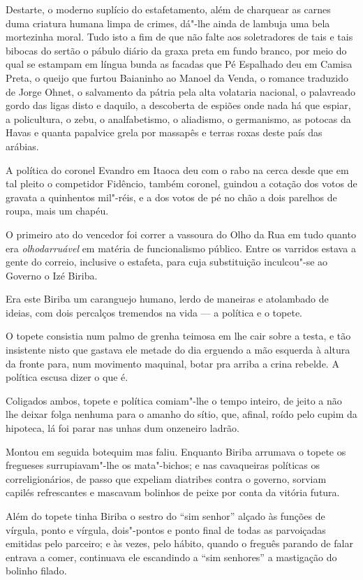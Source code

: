 Destarte, o moderno suplício do estafetamento, além de charquear as
carnes duma criatura humana limpa de crimes, dá"-lhe ainda de lambuja uma
bela mortezinha moral. Tudo isto a fim de que não falte aos soletradores
de tais e tais bibocas do sertão o pábulo diário da graxa preta em fundo
branco, por meio do qual se estampam em língua bunda as facadas que Pé
Espalhado deu em Camisa Preta, o queijo que furtou Baianinho ao Manoel
da Venda, o romance traduzido de Jorge Ohnet, o salvamento da pátria
pela alta volataria nacional, o palavreado gordo das ligas disto e
daquilo, a descoberta de espiões onde nada há que espiar, a policultura,
o zebu, o analfabetismo, o aliadismo, o germanismo, as potocas da Havas
e quanta papalvice grela por massapês e terras roxas deste país das
arábias.

A política do coronel Evandro em Itaoca deu com o rabo na cerca desde
que em tal pleito o competidor Fidêncio, também coronel, guindou a
cotação dos votos de gravata a quinhentos mil"-réis, e a dos votos de pé
no chão a dois parelhos de roupa, mais um chapéu.

O primeiro ato do vencedor foi correr a vassoura do Olho da Rua em tudo
quanto era \emph{olhodarruável} em matéria de funcionalismo público.
Entre os varridos estava a gente do correio, inclusive o estafeta, para
cuja substituição inculcou"-se ao Governo o Izé Biriba.

Era este Biriba um caranguejo humano, lerdo de maneiras e atolambado de
ideias, com dois percalços tremendos na vida --- a política e o topete.

O topete consistia num palmo de grenha teimosa em lhe cair sobre a
testa, e tão insistente nisto que gastava ele metade do dia erguendo a
mão esquerda à altura da fronte para, num movimento maquinal, botar pra
arriba a crina rebelde. A política escusa dizer o que é.

Coligados ambos, topete e política comiam"-lhe o tempo inteiro, de jeito
a não lhe deixar folga nenhuma para o amanho do sítio, que, afinal,
roído pelo cupim da hipoteca, lá foi parar nas unhas dum onzeneiro
ladrão.

Montou em seguida botequim mas faliu. Enquanto Biriba arrumava o topete
os fregueses surrupiavam"-lhe os mata"-bichos; e nas cavaqueiras políticas
os correligionários, de passo que expeliam diatribes contra o governo,
sorviam capilés refrescantes e mascavam bolinhos de peixe por conta da
vitória futura.

Além do topete tinha Biriba o sestro do ``sim senhor'' alçado às funções
de vírgula, ponto e vírgula, dois"-pontos e ponto final de todas as
parvoiçadas emitidas pelo parceiro; e às vezes, pelo hábito, quando o
freguês parando de falar entrava a comer, continuava ele escandindo a
``sim senhores'' a mastigação do bolinho filado.

